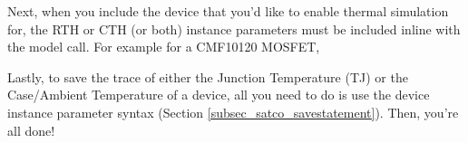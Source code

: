 
Next, when you include the device that you'd like to enable thermal simulation for, the RTH or CTH (or both) instance parameters must be included
inline with the model call. For example for a CMF10120 MOSFET,


Lastly, to save the trace of either the Junction Temperature (TJ) or the Case/Ambient Temperature of a device, all you need to do is use the
device instance parameter syntax (Section \ref{subsec_satco_savestatement}). Then, you're all done! \\








